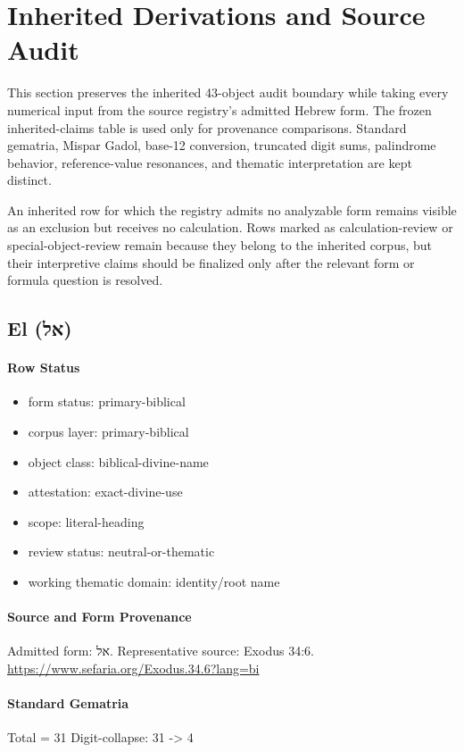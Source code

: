 \section{Inherited Derivations and Source Audit}

This section preserves the inherited 43-object audit boundary while taking every numerical input from the source registry's admitted Hebrew form. The frozen inherited-claims table is used only for provenance comparisons. Standard gematria, Mispar Gadol, base-12 conversion, truncated digit sums, palindrome behavior, reference-value resonances, and thematic interpretation are kept distinct.

An inherited row for which the registry admits no analyzable form remains visible as an exclusion but receives no calculation. Rows marked as calculation-review or special-object-review remain because they belong to the inherited corpus, but their interpretive claims should be finalized only after the relevant form or formula question is resolved.


\subsection{El (אל)}
\paragraph{Row Status}
\begin{itemize}
\item form status: primary-biblical
\item corpus layer: primary-biblical
\item object class: biblical-divine-name
\item attestation: exact-divine-use
\item scope: literal-heading
\item review status: neutral-or-thematic
\item working thematic domain: identity/root name
\end{itemize}
\paragraph{Source and Form Provenance}
Admitted form: אל.
Representative source: Exodus 34:6.
\url{https://www.sefaria.org/Exodus.34.6?lang=bi}
\paragraph{Standard Gematria}
Total = 31
Digit-collapse: 31 -> 4
